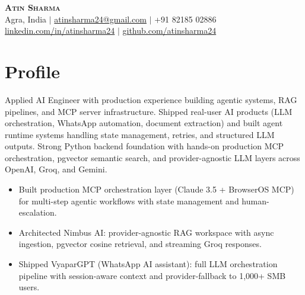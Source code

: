 \documentclass[a4paper,10pt]{article}
\newcommand{\resumeItem}[1]{
  \item\small{{#1 \vspace{-2pt}}}
}
\newcommand{\resumeItemListStart}{\begin{itemize}}
\newcommand{\resumeItemListEnd}{\end{itemize}\vspace{-5pt}}
\begin{document}
\begin{center}
    \textbf{\Huge \scshape Atin Sharma} \\ \vspace{1pt}
    \small Agra, India $|$ \href{mailto:atinsharma24@gmail.com}{atinsharma24@gmail.com} $|$ +91 82185 02886 \\
    \small \href{https://linkedin.com/in/atinsharma24}{linkedin.com/in/atinsharma24} $|$ \href{https://github.com/atinsharma24}{github.com/atinsharma24}
\end{center}

\section{Profile}
\vspace{2pt}
\small{Applied AI Engineer with production experience building agentic systems, RAG pipelines, and MCP server infrastructure. Shipped real-user AI products (LLM orchestration, WhatsApp automation, document extraction) and built agent runtime systems handling state management, retries, and structured LLM outputs. Strong Python backend foundation with hands-on production MCP orchestration, pgvector semantic search, and provider-agnostic LLM layers across OpenAI, Groq, and Gemini.}
\vspace{-4pt}
\resumeItemListStart
    \resumeItem{Built production MCP orchestration layer (Claude 3.5 + BrowserOS MCP) for multi-step agentic workflows with state management and human-escalation.}
    \resumeItem{Architected Nimbus AI: provider-agnostic RAG workspace with async ingestion, pgvector cosine retrieval, and streaming Groq responses.}
    \resumeItem{Shipped VyaparGPT (WhatsApp AI assistant): full LLM orchestration pipeline with session-aware context and provider-fallback to 1,000+ SMB users.}
\resumeItemListEnd
\end{document}
